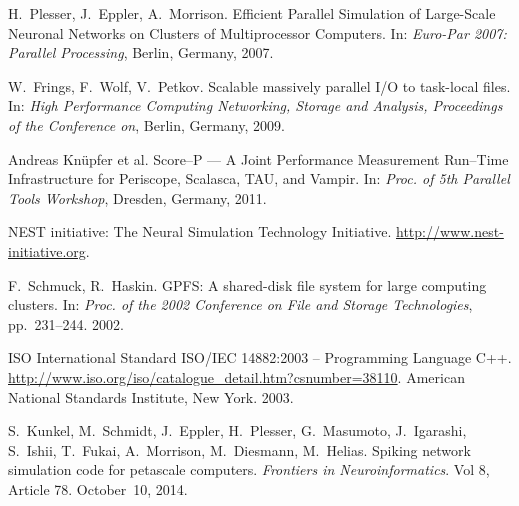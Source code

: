 \documentclass[]{YIC2015}
\begin{document}
\begin{thebibliography}{99}
H.~Plesser, J.~Eppler, A.~Morrison. Efficient Parallel Simulation of Large-Scale
                  Neuronal Networks on Clusters of Multiprocessor
                  Computers. In: \textit{Euro-Par 2007: Parallel Processing}, Berlin, Germany, 2007.

W.~Frings, F.~Wolf, V.~Petkov. Scalable massively parallel I/O to task-local files.
 In: \textit{High Performance Computing Networking, Storage and Analysis, Proceedings of the Conference on}, Berlin, Germany, 2009.

Andreas Kn\"upfer et al. Score--P --- A Joint Performance Measurement Run--Time Infrastructure for Periscope, Scalasca, TAU, and Vampir. In: \textit{Proc. of 5th Parallel Tools Workshop}, Dresden, Germany, 2011.

  NEST initiative: The Neural Simulation Technology Initiative. \url{http://www.nest-initiative.org}.

  F.~Schmuck, R.~Haskin. GPFS: A shared-disk file system for large computing clusters.
  In: \textit{Proc. of the 2002 Conference on File and Storage Technologies}, pp.~231--244. 2002.

  ISO International Standard ISO/IEC 14882:2003 -- Programming Language C++. 
  \url{http://www.iso.org/iso/catalogue_detail.htm?csnumber=38110}.
  American National Standards Institute, New York. 2003.

  S.~Kunkel, M.~Schmidt, J.~Eppler, H.~Plesser, G.~Masumoto, J.~Igarashi, S.~Ishii, T.~Fukai, A.~Morrison, M.~Diesmann, M.~Helias.
  Spiking network simulation code for petascale computers.
  \textit{Frontiers in Neuroinformatics}. Vol 8, Article 78. October~10, 2014.




\end{thebibliography}
\end{document}
